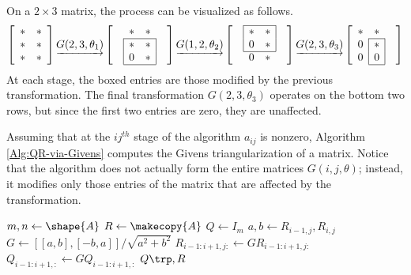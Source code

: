 On a $2 \times 3$ matrix, the process can be visualized as follows.
\[
\left[\begin{array}{cc}
* & * \\
* & * \\
* & * \\
\end{array}\right]
\underrightarrow{G(2,3,\theta_1)}
\left[\begin{array}{cccc}
&      *  &      *  & \\
\cline{2-3}
& \lvl{*} & \rvl{*} & \\
& \lvl{0} & \rvl{*} & \\
\cline{2-3}
\end{array}\right]
\underrightarrow{G(1,2,\theta_2)}
\left[\begin{array}{cccc}
\cline{2-3}
& \lvl{*} & \rvl{*} & \\
& \lvl{0} & \rvl{*} & \\
\cline{2-3}
&      0  &      *  & \\
\end{array}\right]
\underrightarrow{G(2,3,\theta_3)}
\left[\begin{array}{ccc}
     * &       *  & \\
\cline{2-2}
\rvl{0} & \rvl{*} & \\
\rvl{0} & \rvl{0} & \\
\cline{2-2}
\end{array}\right]
\]
At each stage, the boxed entries are those modified by the previous transformation.
The final transformation $G(2,3,\theta_3)$ operates on the bottom two rows, but since the first two entries are zero, they are unaffected.

Assuming that at the $ij^{th}$ stage of the algorithm $a_{ij}$ is nonzero, Algorithm \ref{Alg:QR-via-Givens} computes the Givens triangularization of a matrix.
Notice that the algorithm does not actually form the entire matrices $G(i,j,\theta)$; instead, it modifies only those entries of the matrix that are affected by the transformation.

\begin{algorithm}[H]
\begin{algorithmic}[1]
\State $m, n \gets \shape{A}$
\State $R \gets \makecopy{A}$
\State $Q \gets I_{m}$
      \State $a, b \gets R_{i-1,j}, R_{i,j}$
      \State $G \gets [[a, b],[-b,a]]/\sqrt{a^2+b^2}$
      \State $R_{i-1:i+1,j:} \gets GR_{i-1:i+1, j:}$
      \State $Q_{i-1:i+1,:} \gets GQ_{i-1:i+1,:}$
    \EndFor
\EndFor
\State {} $Q\trp , R$
\EndProcedure
\end{algorithmic}
\caption{}
\label{Alg:QR-via-Givens}
\end{algorithm}

